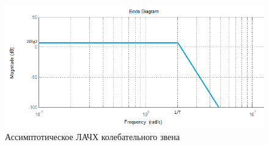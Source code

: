 \documentclass[a4paper, 11pt, russian]{article}
\begin{document}
    \begin{figure}[ht!]
        \centering
        \includegraphics[scale = 0.57]{oscillatoryLinkAsymp}
        \caption{Ассимптотическое ЛАЧХ колебательного звена}
    \end{figure}
    
    \clearpage
\end{document}
